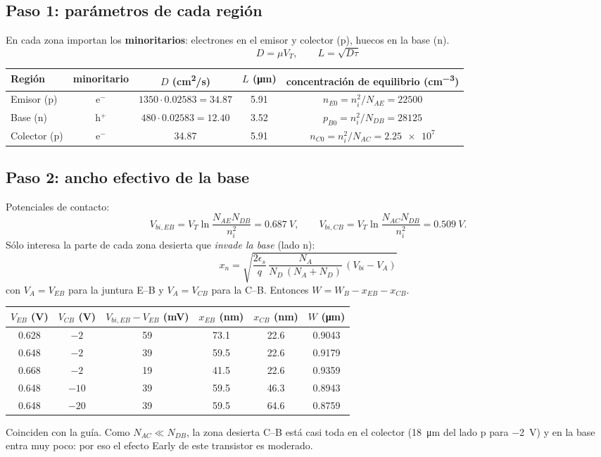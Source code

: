 \documentclass[11pt,a4paper]{article}
\begin{document}
\subsection*{Paso 1: parámetros de cada región}
En cada zona importan los \textbf{minoritarios}: electrones en el emisor y colector (p), huecos en
la base (n).
\[
  D=\mu V_T,\qquad L=\sqrt{D\tau}
\]
\begin{table}[H]
\centering\small
\begin{tabular}{lcccc}
\toprule
Región & minoritario & $D$ (\si{cm^2/s}) & $L$ (\si{\micro m}) & concentración de equilibrio (\si{cm^{-3}}) \\
\midrule
Emisor (p) & e$^-$ & $1350\cdot0.02583=34.87$ & 5.91 & $n_{E0}=n_i^2/N_{AE}=\num{22500}$ \\
Base (n) & h$^+$ & $480\cdot0.02583=12.40$ & 3.52 & $p_{B0}=n_i^2/N_{DB}=\num{28125}$ \\
Colector (p) & e$^-$ & 34.87 & 5.91 & $n_{C0}=n_i^2/N_{AC}=\num{2.25e7}$ \\
\bottomrule
\end{tabular}
\end{table}

\subsection*{Paso 2: ancho efectivo de la base}
Potenciales de contacto:
\[
  V_{bi,EB}=V_T\ln\frac{N_{AE}N_{DB}}{n_i^2}=\SI{0.687}{V},\qquad
  V_{bi,CB}=V_T\ln\frac{N_{AC}N_{DB}}{n_i^2}=\SI{0.509}{V}.
\]
Sólo interesa la parte de cada zona desierta que \emph{invade la base} (lado n):
\[
  x_{n}=\sqrt{\frac{2\epsilon_s}{q}\,\frac{N_A}{N_D\,(N_A+N_D)}\,(V_{bi}-V_A)}
\]
con $V_A=V_{EB}$ para la juntura E--B y $V_A=V_{CB}$ para la C--B. Entonces
$W=W_B-x_{EB}-x_{CB}$.

\begin{table}[H]
\centering\small
\begin{tabular}{cccccc}
\toprule
$V_{EB}$ (V) & $V_{CB}$ (V) & $V_{bi,EB}-V_{EB}$ (mV) & $x_{EB}$ (nm) & $x_{CB}$ (nm) & $W$ (\si{\micro m}) \\
\midrule
0.628 & $-2$ & 59 & 73.1 & 22.6 & 0.9043 \\
0.648 & $-2$ & 39 & 59.5 & 22.6 & 0.9179 \\
0.668 & $-2$ & 19 & 41.5 & 22.6 & 0.9359 \\
0.648 & $-10$ & 39 & 59.5 & 46.3 & 0.8943 \\
0.648 & $-20$ & 39 & 59.5 & 64.6 & 0.8759 \\
\bottomrule
\end{tabular}
\end{table}
Coinciden con la guía. Como $N_{AC}\ll N_{DB}$, la zona desierta C--B está casi toda en el
colector (\SI{18}{\micro m} del lado p para \SI{-2}{V}) y en la base entra muy poco: por eso el
efecto Early de este transistor es moderado.
\end{document}
